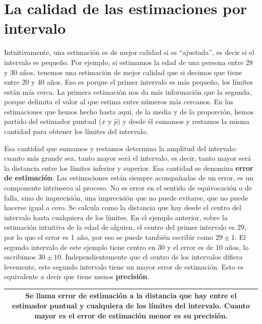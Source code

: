 \documentclass[]{book}
\begin{document}
\hypertarget{la-calidad-de-las-estimaciones-por-intervalo}{%
\section{La calidad de las estimaciones por intervalo}\label{la-calidad-de-las-estimaciones-por-intervalo}}

Intuitivamente, una estimación es de mejor calidad si es ``ajustada'', es
decir si el intervalo es pequeño. Por ejemplo, si estimamos la edad de
una persona entre 28 y 30 años, tenemos una estimación de mejor calidad
que si decimos que tiene entre 20 y 40 años. Eso es porque el primer
intervalo es más pequeño, los límites están más cerca. La primera
estimación nos da más información que la segunda, porque delimita el
valor al que estima entre números más cercanos. En las estimaciones que
hemos hecho hasta aquí, de la media y de la proporción, hemos partido
del estimador puntual (\(\overline{x}\) y \(\widehat{p}\)) y desde él
sumamos y restamos la misma cantidad para obtener los límites del
intervalo.

Esa cantidad que sumamos y restamos determina la amplitud del intervalo:
cuanto más grande sea, tanto mayor será el intervalo, es decir, tanto
mayor será la distancia entre los límites inferior y superior. Esa
cantidad se denomina \textbf{error de estimación}. Las estimaciones están
siempre acompañadas de un error, es un componente intrínseco al proceso.
No es error en el sentido de equivocación o de falla, sino de
imprecisión, una imprecisión que no puede evitarse, que no puede hacerse
igual a cero. Se calcula como la distancia que hay desde el centro del
intervalo hasta cualquiera de los límites. En el ejemplo anterior, sobre
la estimación intuitiva de la edad de alguien, el centro del primer
intervalo es 29, por lo que el error es 1 año, por eso se puede también
escribir como \(29 \pm 1\). El segundo intervalo de este ejemplo tiene
centro en 30 y el error es de 10 años, lo escribimos \(30 \pm 10\).
Independientemente que el centro de los intervalos difiera levemente,
este segundo intervalo tiene un mayor error de estimación. Esto es
equivalente a decir que tiene menos \textbf{precisión}.

\begin{longtable}[]{@{}c@{}}
\toprule
\endhead
\begin{minipage}[t]{0.97\columnwidth}\centering
Se llama \textbf{error de estimación} a la distancia que hay entre el estimador puntual y cualquiera de los límites del intervalo. Cuanto mayor es el error de estimación menor es su \textbf{precisión}.\strut
\end{minipage}\tabularnewline
\bottomrule
\end{longtable}
\end{document}
